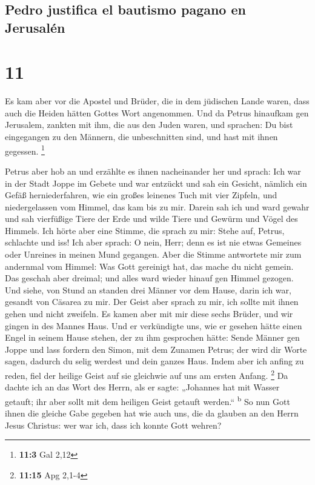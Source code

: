 \hypertarget{pedro-justifica-el-bautismo-pagano-en-jerusaluxe9n}{%
\subsection{Pedro justifica el bautismo pagano en
Jerusalén}\label{pedro-justifica-el-bautismo-pagano-en-jerusaluxe9n}}

\hypertarget{section-10}{%
\section{11}\label{section-10}}

 Es kam aber vor die Apostel und Brüder, die in dem
jüdischen Lande waren, dass auch die Heiden hätten Gottes Wort
angenommen.  Und da Petrus hinaufkam gen Jerusalem,
zankten mit ihm, die aus den Juden waren,  und sprachen:
Du bist eingegangen zu den Männern, die unbeschnitten sind, und hast mit
ihnen gegessen. \footnote{\textbf{11:3} Gal 2,12}

 Petrus aber hob an und erzählte es ihnen nacheinander her
und sprach:  Ich war in der Stadt Joppe im Gebete und war
entzückt und sah ein Gesicht, nämlich ein Gefäß herniederfahren, wie ein
großes leinenes Tuch mit vier Zipfeln, und niedergelassen vom Himmel,
das kam bis zu mir.  Darein sah ich und ward gewahr und
sah vierfüßige Tiere der Erde und wilde Tiere und Gewürm und Vögel des
Himmels.  Ich hörte aber eine Stimme, die sprach zu mir:
Stehe auf, Petrus, schlachte und iss!  Ich aber sprach: O
nein, Herr; denn es ist nie etwas Gemeines oder Unreines in meinen Mund
gegangen.  Aber die Stimme antwortete mir zum andernmal
vom Himmel: Was Gott gereinigt hat, das mache du nicht gemein.
 Das geschah aber dreimal; und alles ward wieder hinauf
gen Himmel gezogen.  Und siehe, von Stund an standen drei
Männer vor dem Hause, darin ich war, gesandt von Cäsarea zu mir.
 Der Geist aber sprach zu mir, ich sollte mit ihnen gehen
und nicht zweifeln. Es kamen aber mit mir diese sechs Brüder, und wir
gingen in des Mannes Haus.  Und er verkündigte uns, wie
er gesehen hätte einen Engel in seinem Hause stehen, der zu ihm
gesprochen hätte: Sende Männer gen Joppe und lass fordern den Simon, mit
dem Zunamen Petrus;  der wird dir Worte sagen, dadurch du
selig werdest und dein ganzes Haus.  Indem aber ich
anfing zu reden, fiel der heilige Geist auf sie gleichwie auf uns am
ersten Anfang. \footnote{\textbf{11:15} Apg 2,1-4}  Da
dachte ich an das Wort des Herrn, als er sagte: „Johannes hat mit Wasser
getauft; ihr aber sollt mit dem heiligen Geist getauft werden.``
\textsuperscript{b}  So nun Gott ihnen die gleiche Gabe
gegeben hat wie auch uns, die da glauben an den Herrn Jesus Christus:
wer war ich, dass ich konnte Gott wehren?

